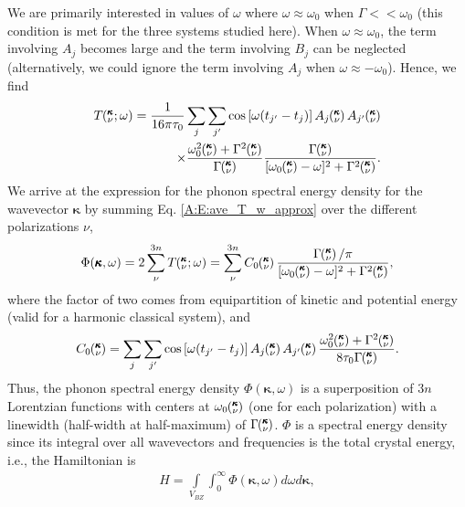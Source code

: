 \documentclass[letterpaper,12pt]{article}
\newcommand{\kvw}{\mspace{-4.0mu}\left(\mspace{-8.0mu}\begin{smallmatrix}&\pmb{\kappa} \\&\nu\end{smallmatrix}\mspace{-2.0mu};\omega\right)}
\newcommand{\kv}{\mspace{-4.0mu}\left(\mspace{-8.0mu}\begin{smallmatrix}&\pmb{\kappa} \\&\nu\end{smallmatrix}\mspace{-3.0mu}\right)}
\begin{document}
We are primarily interested in values of $\omega$ where $\omega\approx\omega_0$ when $\Gamma<<\omega_0$ (this condition is met for the three systems studied here). When $\omega\approx\omega_0$, the term involving $A_j$ becomes large and the term involving $B_j$ can be neglected (alternatively, we could ignore the term involving $A_j$ when $\omega\approx-\omega_0$). Hence, we find
\begin{equation}\label{A:E:ave_T_w_approx}
\begin{split}
T\kvw=\frac{1}{16\pi\tau_0}\sum_j\sum_{j'}\cos\left[\omega (t_{j'}-t_j)\right]A_j\kv A_{j'}\kv\\
\times\frac{\omega_0^2\kv+\Gamma^2\kv}{\Gamma\kv}\frac{\Gamma\kv}{[\omega_0\kv-\omega]^2+\Gamma^2\kv}.
\end{split}
\end{equation}
We arrive at the expression for the phonon spectral energy density for the wavevector $\pmb{\kappa}$ by summing Eq$.$ \eqref{A:E:ave_T_w_approx} over the different polarizations $\nu$,
\begin{equation}\label{A:E:Lorentzian_NMD}
\begin{split}
\Phi(\pmb{\kappa},\omega) = 2\sum_{\nu}^{3n} T\kvw=\sum_{\nu}^{3n}C_0\kv\frac{\Gamma\kv/\pi}{[\omega_0\kv-\omega]^2+\Gamma^2\kv},
\end{split}
\end{equation}
where the factor of two comes from equipartition of kinetic and potential energy (valid for a harmonic classical system), and
\begin{equation}\label{A:E:C_0}
\begin{split}
C_0\kv = \sum_j\sum_{j'}\cos\left[\omega (t_{j'}-t_j)\right]A_j\kv A_{j'}\kv\frac{\omega_0^2\kv+\Gamma^2\kv}{8\tau_0\Gamma\kv}.
\end{split}
\end{equation}
Thus, the phonon spectral energy density $\Phi(\pmb{\kappa},\omega)$ is a superposition of $3n$ Lorentzian
functions with centers at $\omega_0\kv$ (one for each polarization) with a linewidth (half-width at half-maximum) of
$\Gamma\kv$. $\Phi$ is a spectral energy density since its integral over all wavevectors and frequencies is the total crystal energy, i.e., the Hamiltonian is
\begin{equation}\label{A:E:equipartition}
\begin{split}
H=\int\limits_{V_{BZ}} \int_{0}^{\infty}\Phi(\pmb{\kappa},\omega)d\omega d\pmb{\kappa},
\end{split}
\end{equation}
\end{document}
